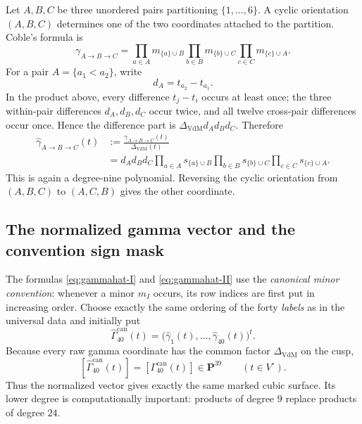 \documentclass[11pt]{article}
\newcommand{\PP}{\mathbf{P}}
\newcommand{\Gamhat}{\widehat{\Gamma}}
\newcommand{\gamhat}{\widehat{\gamma}}
\newcommand{\Deltav}{\Delta_{\mathrm{VdM}}}
\begin{document}
Let $A,B,C$ be three unordered pairs partitioning $\{1,\ldots,6\}$.  A cyclic
orientation $(A,B,C)$ determines one of the two coordinates attached to the
partition.  Coble's formula is
\[
 \gamma_{A\to B\to C}
 =
 \prod_{a\in A}m_{\{a\}\cup B}
 \prod_{b\in B}m_{\{b\}\cup C}
 \prod_{c\in C}m_{\{c\}\cup A}.
\]
For a pair $A=\{a_1<a_2\}$, write
\[
  d_A=t_{a_2}-t_{a_1}.
\]
In the product above, every difference $t_j-t_i$ occurs at least once; the three
within-pair differences $d_A,d_B,d_C$ occur twice, and all twelve cross-pair
differences occur once.  Hence the difference part is
$\Deltav d_A d_B d_C$.  Therefore
\begin{equation}
\boxed{
\begin{aligned}
 \gamhat_{A\to B\to C}(t)
 &:=\frac{\gamma_{A\to B\to C}(t)}{\Deltav(t)}\\
 &=d_A d_B d_C
 \prod_{a\in A}s_{\{a\}\cup B}
 \prod_{b\in B}s_{\{b\}\cup C}
 \prod_{c\in C}s_{\{c\}\cup A}.
\end{aligned}}
\label{eq:gammahat-II}
\end{equation}
This is again a degree-nine polynomial.  Reversing the cyclic orientation from
$(A,B,C)$ to $(A,C,B)$ gives the other coordinate.

\subsection{The normalized gamma vector and the convention sign mask}

The formulas \eqref{eq:gammahat-I} and \eqref{eq:gammahat-II} use the
\emph{canonical minor convention}: whenever a minor $m_I$ occurs, its row indices
are first put in increasing order.  Choose exactly the same ordering of the forty
\emph{labels} as in the universal data and initially put
\[
  \Gamhat^{\mathrm{can}}_{40}(t)
  =\bigl(\gamhat_1(t),\ldots,\gamhat_{40}(t)\bigr)^t.
\]
Because every raw gamma coordinate has the common factor $\Deltav$ on the cusp,
\[
  [\Gamhat^{\mathrm{can}}_{40}(t)]=[\Gamma^{\mathrm{can}}_{40}(t)]
  \in\PP^{39}
  \qquad(t\in V^\circ).
\]
Thus the normalized vector gives exactly the same marked cubic surface.  Its lower
degree is computationally important: products of degree $9$ replace products of
degree $24$.
\end{document}
